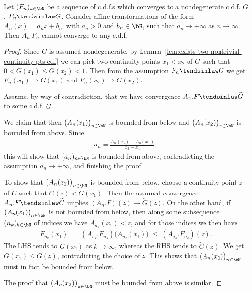 \begin{lemma}
  \label{lem:impossible-expanding-limit}
  \leanok
  Let $(F_n)_{n \in \bN}$ be a sequence of c.d.f.s which converges to a nondegenerate
  c.d.f. $G$, $F_n \tendsinlaw G$. Consider affine transformations of the form $A_n(x) = a_n x + b_n$,
  with $a_n > 0$ and $b_n \in \bR$, such that $a_n \to +\infty$
  as $n \to \infty$. Then $A_n . F_n$ cannot converge to any c.d.f.
\end{lemma}
\begin{proof}
  \leanok
  Since $G$ is assumed nondegenerate, by Lemma~\ref{lem:exists-two-nontrivial-continuity-pts-cdf}
  we can pick two continuity points $x_1 < x_2$
  of $G$ such that $0 < G(x_1) \le G(x_2) < 1$. Then from the assumption
  $F_n \tendsinlaw G$ we get $F_n(x_1) \to G(x_1)$ and $F_n(x_2) \to G(x_2)$.

  Assume, by way of contradiction, that we have convergence
  $A_n . F \tendsinlaw \widetilde{G}$ to some c.d.f. $\widetilde{G}$.

  We claim that then $\big(A_n(x_1)\big)_{n \in \bN}$ is bounded from below and
  $\big(A_n(x_2)\big)_{n \in \bN}$ is bounded from above.
  Since
  \begin{align*}
    a_n = \frac{A_n(x_2) - A_n(x_1)}{x_2 - x_1} ,
  \end{align*}
  this will show that $(a_n)_{n \in \bN}$ is bounded from above, contradicting
  the assumption $a_n \to +\infty$, and finishing the proof.

  To show that $\big(A_n(x_1)\big)_{n \in \bN}$ is bounded from below,
  choose a continuity point $z$ of $\widetilde{G}$ such that
  $\widetilde{G}(z) < G(x_1)$. Then the assumed convergence
  $A_n . F \tendsinlaw \widetilde{G}$ implies
  $(A_n . F)(z) \to \widetilde{G}(z)$.
  On the other hand, if $\big(A_n(x_1)\big)_{n \in \bN}$ is not
  bounded from below, then along some subsequence $(n_k)_{k \in \bN}$ of indices
  we have $A_{n_k}(x_1) < z$, and for those indices we then have
  \begin{align*}
    F_{n_k}(x_1) \; = \; (A_{n_k} . F_{n_k}) \big( A_{n_k}(x_1) \big)
      \; \le \; (A_{n_k} . F_{n_k})(z) .
  \end{align*}
  The LHS tends to $G(x_1)$ as $k \to \infty$, whereas the RHS tends
  to $\widetilde{G}(z)$. We get $G(x_1) \le \widetilde{G}(z)$, contradicting
  the choice of $z$. This shows that $\big(A_n(x_1)\big)_{n \in \bN}$ must
  in fact be bounded from below.

  The proof that $\big(A_n(x_2)\big)_{n \in \bN}$ must be bounded from above
  is similar.
\end{proof}

